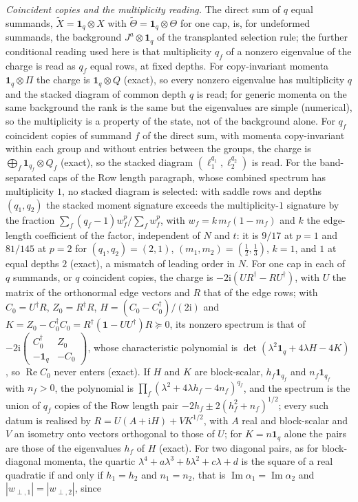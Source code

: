 \emph{Coincident copies and the multiplicity reading.} The direct sum of \(q\) equal summands, \(\widetilde X=\mathbf 1_q\otimes X\) with \(\widetilde\Theta=\mathbf 1_q\otimes\Theta\) for one cap, is, for undeformed summands, the background \(J^a\otimes\mathbf 1_q\) of the transplanted selection rule; the further conditional reading used here is that multiplicity \(q_f\) of a nonzero eigenvalue of the charge is read as \(q_f\) equal rows, at fixed depths. For copy-invariant momenta \(\mathbf 1_q\otimes\Pi\) the charge is \(\mathbf 1_q\otimes Q\) (exact), so every nonzero eigenvalue has multiplicity \(q\) and the stacked diagram of common depth \(q\) is read; for generic momenta on the same background the rank is the same but the eigenvalues are simple (numerical), so the multiplicity is a property of the state, not of the background alone. For \(q_f\) coincident copies of summand \(f\) of the direct sum, with momenta copy-invariant within each group and without entries between the groups, the charge is \(\bigoplus_f\mathbf 1_{q_f}\otimes Q_f\) (exact), so the stacked diagram \((\ell_1^{q_1},\ell_2^{q_2})\) is read. For the band-separated caps of the Row length paragraph, whose combined spectrum has multiplicity \(1\), no stacked diagram is selected: with saddle rows and depths \((q_1,q_2)\) the stacked moment signature exceeds the multiplicity-\(1\) signature by the fraction \(\sum_f(q_f-1)w_f^p/\sum_fw_f^p\), with \(w_f=k\,m_f(1-m_f)\) and \(k\) the edge-length coefficient of the factor, independent of \(N\) and \(t\): it is \(9/17\) at \(p=1\) and \(81/145\) at \(p=2\) for \((q_1,q_2)=(2,1)\), \((m_1,m_2)=(\tfrac12,\tfrac13)\), \(k=1\), and \(1\) at equal depths \(2\) (exact), a mismatch of leading order in \(N\). For one cap in each of \(q\) summands, or \(q\) coincident copies, the charge is \(-2\mathrm i(UR^\dagger-RU^\dagger)\), with \(U\) the matrix of the orthonormal edge vectors and \(R\) that of the edge rows; with \(C_0=U^\dagger R\), \(Z_0=R^\dagger R\), \(H=(C_0-C_0^\dagger)/(2\mathrm i)\) and \(K=Z_0-C_0^\dagger C_0=R^\dagger(\mathbf 1-UU^\dagger)R\succeq0\), its nonzero spectrum is that of \(-2\mathrm i\left(\begin{smallmatrix}C_0^\dagger&Z_0\\-\mathbf 1_q&-C_0\end{smallmatrix}\right)\), whose characteristic polynomial is \(\det(\lambda^2\mathbf 1_q+4\lambda H-4K)\), so \(\operatorname{Re}C_0\) never enters (exact). If \(H\) and \(K\) are block-scalar, \(h_f\mathbf 1_{q_f}\) and \(n_f\mathbf 1_{q_f}\) with \(n_f>0\), the polynomial is \(\prod_f(\lambda^2+4\lambda h_f-4n_f)^{q_f}\), and the spectrum is the union of \(q_f\) copies of the Row length pair \(-2h_f\pm2(h_f^2+n_f)^{1/2}\); every such datum is realised by \(R=U(A+\mathrm iH)+VK^{1/2}\), with \(A\) real and block-scalar and \(V\) an isometry onto vectors orthogonal to those of \(U\); for \(K=n\mathbf 1_q\) alone the pairs are those of the eigenvalues \(h_f\) of \(H\) (exact). For two diagonal pairs, as for block-diagonal momenta, the quartic \(\lambda^4+a\lambda^3+b\lambda^2+c\lambda+d\) is the square of a real quadratic if and only if \(h_1=h_2\) and \(n_1=n_2\), that is \(\operatorname{Im}\alpha_1=\operatorname{Im}\alpha_2\) and \(|w_{\perp,1}|=|w_{\perp,2}|\), since 
